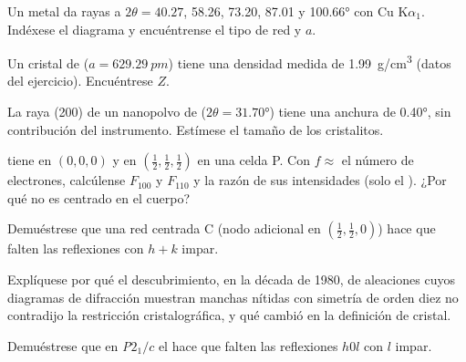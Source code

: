 \begin{exercise}[$\star\star$]\label{exo:b3:x-ray-diffraction:5}
Un metal da rayas a $2\theta = 40.27$, 58.26, 73.20, 87.01 y \ang{100.66} con Cu
K$\alpha_1$. Indéxese el diagrama y encuéntrense el tipo de red y $a$.
\end{exercise}

\begin{exercise}[$\star\star$]\label{exo:b3:x-ray-diffraction:6}
Un cristal de  ($a = \qty{629.29}{pm}$) tiene una densidad medida de
\qty{1.99}{g/cm^3} (datos del ejercicio). Encuéntrese $Z$.
\end{exercise}

\begin{exercise}[$\star\star$]\label{exo:b3:x-ray-diffraction:7}
La raya (200) de un nanopolvo de  ($2\theta = \ang{31.70}$) tiene una anchura de \ang{0.40},
sin contribución del instrumento. Estímese el tamaño de los cristalitos.
\end{exercise}

\begin{exercise}[$\star\star$]\label{exo:b3:x-ray-diffraction:8}
 tiene  en $(0,0,0)$ y  en $(\frac12,\frac12,\frac12)$ en una celda P. Con $f
\approx$ el número de electrones, calcúlense $F_{100}$ y $F_{110}$ y la razón de sus
intensidades (solo el ). ¿Por qué  no es centrado en el cuerpo?
\end{exercise}

\begin{exercise}[$\star\star$]\label{exo:b3:x-ray-diffraction:9}
Demuéstrese que una red centrada C (nodo adicional en $(\frac12,\frac12,0)$) hace que falten las
reflexiones con $h + k$ impar.
\end{exercise}

\begin{exercise}[$\star\star\star$]\label{exo:b3:x-ray-diffraction:10}
Explíquese por qué el descubrimiento, en la década de 1980, de aleaciones cuyos diagramas de difracción muestran
manchas nítidas con simetría de orden diez no contradijo la restricción
cristalográfica, y qué cambió en la definición de cristal.
\end{exercise}

\begin{exercise}[$\star\star\star$]\label{exo:b3:x-ray-diffraction:11}
Demuéstrese que en \textit{P}$2_1/c$ el  hace que falten las reflexiones $h0l$ con $l$
impar.
\end{exercise}

